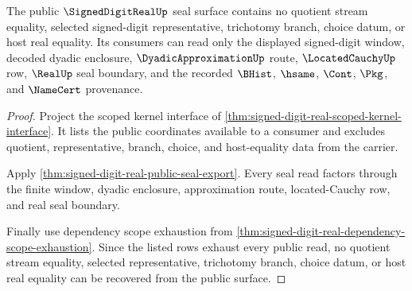 \begin{theorem}
\label{thm:signed-digit-real-public-representative-exclusion}
The public $\SignedDigitRealUp$ seal surface contains no quotient stream equality, selected signed-digit representative, trichotomy branch, choice datum, or host real equality. Its consumers can read only the displayed signed-digit window, decoded dyadic enclosure, $\DyadicApproximationUp$ route, $\LocatedCauchyUp$ row, $\RealUp$ seal boundary, and the recorded $\BHist$, $\hsame$, $\Cont$, $\Pkg$, and $\NameCert$ provenance.
\end{theorem}
\begin{proof}
Project the scoped kernel interface of \autoref{thm:signed-digit-real-scoped-kernel-interface}. It lists the public coordinates available to a consumer and excludes quotient, representative, branch, choice, and host-equality data from the carrier.

Apply \autoref{thm:signed-digit-real-public-seal-export}. Every seal read factors through the finite window, dyadic enclosure, approximation route, located-Cauchy row, and real seal boundary.

Finally use dependency scope exhaustion from \autoref{thm:signed-digit-real-dependency-scope-exhaustion}. Since the listed rows exhaust every public read, no quotient stream equality, selected representative, trichotomy branch, choice datum, or host real equality can be recovered from the public surface.
\end{proof}

